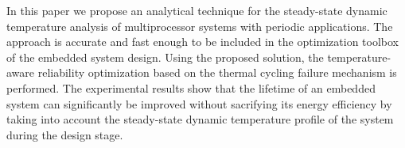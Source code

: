 In this paper we propose an analytical technique for the steady-state dynamic temperature analysis of multiprocessor systems with periodic applications. The approach is accurate and fast enough to be included in the optimization toolbox of the embedded system design. Using the proposed solution, the temperature-aware reliability optimization based on the thermal cycling failure mechanism is performed. The experimental results show that the lifetime of an embedded system can significantly be improved without sacrifying its energy efficiency by taking into account the steady-state dynamic temperature profile of the system during the design stage.
